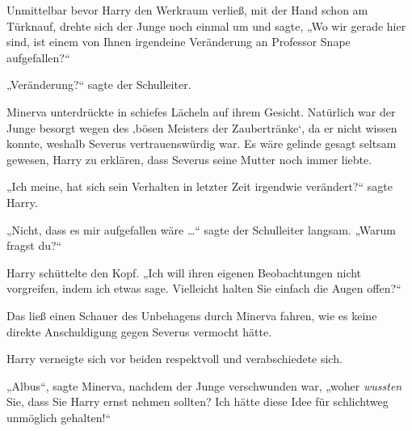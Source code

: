 Unmittelbar bevor Harry den Werkraum verließ, mit der Hand schon am Türknauf, drehte sich der Junge noch einmal um und sagte,
„Wo wir gerade hier sind, ist einem von Ihnen irgendeine Veränderung an Professor Snape aufgefallen?“

„Veränderung?“ sagte der Schulleiter.

Minerva unterdrückte in schiefes Lächeln auf ihrem Gesicht. Natürlich war der Junge besorgt wegen des ‚bösen Meisters der Zaubertränke‘, da er nicht wissen konnte, weshalb Severus vertrauenswürdig war. Es wäre gelinde gesagt seltsam gewesen, Harry zu erklären, dass Severus seine Mutter noch immer liebte.

„Ich meine, hat sich sein Verhalten in letzter Zeit irgendwie verändert?“ sagte Harry.

„Nicht, dass es mir aufgefallen wäre …“ sagte der Schulleiter langsam.
„Warum fragst du?“

Harry schüttelte den Kopf.
„Ich will ihren eigenen Beobachtungen nicht vorgreifen, indem ich etwas sage. Vielleicht halten Sie einfach die Augen offen?“

Das ließ einen Schauer des Unbehagens durch Minerva fahren, wie es keine direkte Anschuldigung gegen Severus vermocht hätte.

Harry verneigte sich vor beiden respektvoll und verabschiedete sich.

\later

„Albus“, sagte Minerva, nachdem der Junge verschwunden war, „woher \emph{wussten} Sie, dass Sie Harry ernst nehmen sollten? Ich hätte diese Idee für schlichtweg unmöglich gehalten!“

